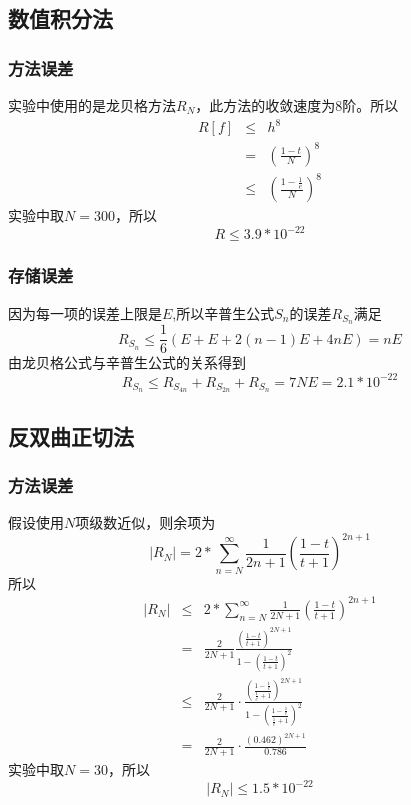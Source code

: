 \documentclass[UTF8,twocolum,titlepage]{ctexart}
\begin{document}
\subsection*{数值积分法}
\subsubsection*{方法误差}
实验中使用的是龙贝格方法$R_N$，此方法的收敛速度为8阶。所以
\begin{eqnarray*}
R\left[f\right] &\le& h^8\\&=&\left(\frac{1-t}{N}\right)^8\\ &\le& \left(\frac{1-\frac{1}{e}}{N}\right)^8
\end{eqnarray*}
实验中取$N=300$，所以$$R \le 3.9*10^{-22}$$
\subsubsection*{存储误差}
因为每一项的误差上限是$E$,所以辛普生公式$S_n$的误差$R_{S_n}$满足$$R_{S_n} \le \frac{1}{6}\left(E+E+2(n-1)E+4nE\right) = nE$$由龙贝格公式与辛普生公式的关系得到$$R_{S_n} \le R_{S_{4n}}+R_{S_{2n}}+R_{S_{n}}=7NE=2.1*10^{-22}$$
\subsection*{反双曲正切法}
\subsubsection*{方法误差}
假设使用$N$项级数近似，则余项为$$\left|R_N\right| =  2*\sum_{n=N}^{\infty}\frac{1}{2n+1}\left(\frac{1-t}{t+1}\right)^{2n+1}$$所以
\begin{eqnarray*}
\left|R_N\right| &\le& 2*\sum_{n=N}^{\infty}\frac{1}{2N+1}\left(\frac{1-t}{t+1}\right)^{2n+1} \\ &=& \frac{2}{2N+1}\frac{\left(\frac{1-t}{t+1}\right)^{2N+1}}{1-\left(\frac{1-t}{t+1}\right)^2}\\&\le& \frac{2}{2N+1}\cdot\frac{\left(\frac{1-\frac{1}{e}}{\frac{1}{e}+1}\right)^{2N+1}}{1-\left(\frac{1-\frac{1}{e}}{\frac{1}{e}+1}\right)^2}\\&=&\frac{2}{2N+1}\cdot\frac{\left(0.462\right)^{2N+1}}{0.786}
\end{eqnarray*}
实验中取$N=30$，所以$$\left|R_N\right| \le 1.5*10^{-22}$$
\end{document}
